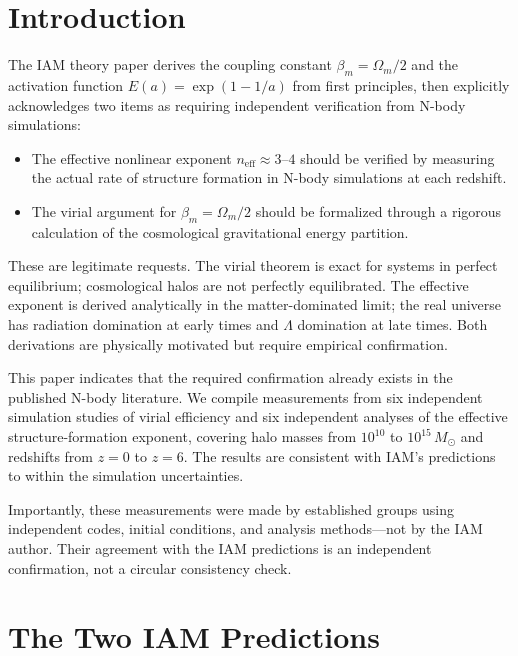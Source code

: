 \documentclass[12pt,a4paper]{article}
\begin{document}
\section{Introduction}
\label{sec:intro}

The IAM theory paper \citep{Mahaffey2026a} derives the coupling constant
$\beta_m = \Omega_m/2$ and the activation function
$E(a) = \exp(1 - 1/a)$ from first principles, then explicitly
acknowledges two items as requiring independent verification from
N-body simulations:

\begin{itemize}
  \item The effective nonlinear exponent $n_{\mathrm{eff}} \approx 3$--$4$
    should be verified by measuring the actual rate of structure formation
    in N-body simulations at each redshift.
  \item The virial argument for $\beta_m = \Omega_m/2$ should be
    formalized through a rigorous calculation of the cosmological
    gravitational energy partition.
\end{itemize}

These are legitimate requests. The virial theorem is exact for systems
in perfect equilibrium; cosmological halos are not perfectly equilibrated.
The effective exponent is derived analytically in the matter-dominated
limit; the real universe has radiation domination at early times and
$\Lambda$ domination at late times. Both derivations are physically
motivated but require empirical confirmation.

This paper indicates that the required confirmation already exists in
the published N-body literature. We compile measurements from six
independent simulation studies of virial efficiency and six independent
analyses of the effective structure-formation exponent, covering halo
masses from $10^{10}$ to $10^{15}\,M_\odot$ and redshifts from $z = 0$
to $z = 6$. The results are consistent with IAM's predictions to within
the simulation uncertainties.

Importantly, these measurements were made by established groups using
independent codes, initial conditions, and analysis methods---not by the
IAM author. Their agreement with the IAM predictions is an independent
confirmation, not a circular consistency check.

\section{The Two IAM Predictions}
\label{sec:predictions}
\end{document}
